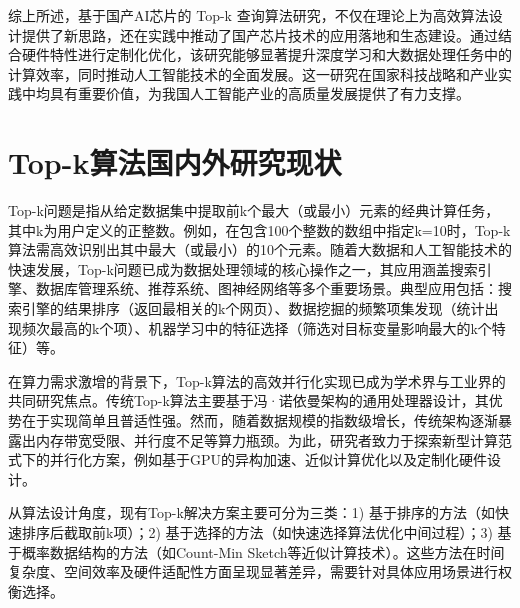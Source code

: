 综上所述，基于国产AI芯片的 Top-k 查询算法研究，不仅在理论上为高效算法设计提供了新思路，还在实践中推动了国产芯片技术的应用落地和生态建设。通过结合硬件特性进行定制化优化，该研究能够显著提升深度学习和大数据处理任务中的计算效率，同时推动人工智能技术的全面发展。这一研究在国家科技战略和产业实践中均具有重要价值，为我国人工智能产业的高质量发展提供了有力支撑。

\section{Top-k算法国内外研究现状}

Top-k问题是指从给定数据集中提取前k个最大（或最小）元素的经典计算任务，其中k为用户定义的正整数。例如，在包含100个整数的数组中指定k=10时，Top-k算法需高效识别出其中最大（或最小）的10个元素\cite{hoare1961algorithm}。‌随着大数据和人工智能技术的快速发展，Top-k问题已成为数据处理领域的核心操作之一，其应用涵盖搜索引擎、数据库管理系统、推荐系统、图神经网络等多个重要场景‌。典型应用包括：‌搜索引擎的结果排序（返回最相关的k个网页）、数据挖掘的频繁项集发现（统计出现频次最高的k个项）、机器学习中的特征选择（筛选对目标变量影响最大的k个特征）等‌。

‌在算力需求激增的背景下，Top-k算法的高效并行化实现已成为学术界与工业界的共同研究焦点‌\cite{zhang2023parallel}\cite{Gaihre_Zheng_Weitze_Li_Song_Ding_Li_Liu_2021}。‌传统Top-k算法主要基于冯·诺依曼架构的通用处理器设计，其优势在于实现简单且普适性强‌。‌然而，随着数据规模的指数级增长，传统架构逐渐暴露出内存带宽受限、并行度不足等算力瓶颈‌。‌为此，研究者致力于探索新型计算范式下的并行化方案，例如基于GPU的异构加速、近似计算优化以及定制化硬件设计‌。

‌从算法设计角度，现有Top-k解决方案主要可分为三类‌：1) ‌基于排序的方法‌（如快速排序后截取前k项）；2) ‌基于选择的方法‌（如快速选择算法优化中间过程）；3) ‌基于概率数据结构的方法‌（如Count-Min Sketch等近似计算技术）\cite{baidu2024topk}。‌这些方法在时间复杂度、空间效率及硬件适配性方面呈现显著差异，需要针对具体应用场景进行权衡选择‌。

